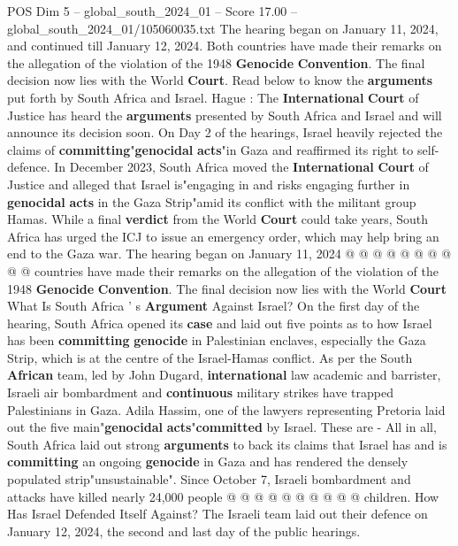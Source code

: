 \begin{textsample}{POS Dim 5 – global\_south\_2024\_01 – Score 17.00 – global\_south\_2024\_01/105060035.txt}  \label{ex:f5_pos_019}
The hearing began on January 11, 2024, and continued till January 12, 2024.
Both countries have made their remarks on the allegation of the violation of the 1948 \textbf{Genocide} \textbf{Convention}.
The final decision now lies with the World \textbf{Court}.
Read below to know the \textbf{arguments} put forth by South Africa and Israel.
Hague : The \textbf{International} \textbf{Court} of Justice has heard the \textbf{arguments} presented by South Africa and Israel and will announce its decision soon.
On Day 2 of the hearings, Israel heavily rejected the claims of \textbf{committing}"\textbf{genocidal} \textbf{acts}"in Gaza and reaffirmed its right to self-defence.
In December 2023, South Africa moved the \textbf{International} \textbf{Court} of Justice and alleged that Israel is"engaging in and risks engaging further in \textbf{genocidal} \textbf{acts} in the Gaza Strip"amid its conflict with the militant group Hamas.
While a final \textbf{verdict} from the World \textbf{Court} could take years, South Africa has urged the ICJ to issue an emergency order, which may help bring an end to the Gaza war.
The hearing began on January 11, 2024 @ @ @ @ @ @ @ @ @ @ countries have made their remarks on the allegation of the violation of the 1948 \textbf{Genocide} \textbf{Convention}.
The final decision now lies with the World \textbf{Court} What Is South Africa ' s \textbf{Argument} Against Israel?
On the first day of the hearing, South Africa opened its \textbf{case} and laid out five points as to how Israel has been \textbf{committing} \textbf{genocide} in Palestinian enclaves, especially the Gaza Strip, which is at the centre of the Israel-Hamas conflict.
As per the South \textbf{African} team, led by John Dugard, \textbf{international} law academic and barrister, Israeli air bombardment and \textbf{continuous} military strikes have trapped Palestinians in Gaza.
Adila Hassim, one of the lawyers representing Pretoria laid out the five main"\textbf{genocidal} \textbf{acts}"\textbf{committed} by Israel.
These are - All in all, South Africa laid out strong \textbf{arguments} to back its claims that Israel has and is \textbf{committing} an ongoing \textbf{genocide} in Gaza and has rendered the densely populated strip"unsustainable".
Since October 7, Israeli bombardment and attacks have killed nearly 24,000 people @ @ @ @ @ @ @ @ @ @ children.
How Has Israel Defended Itself Against?
The Israeli team laid out their defence on January 12, 2024, the second and last day of the public hearings.

\end{textsample}
